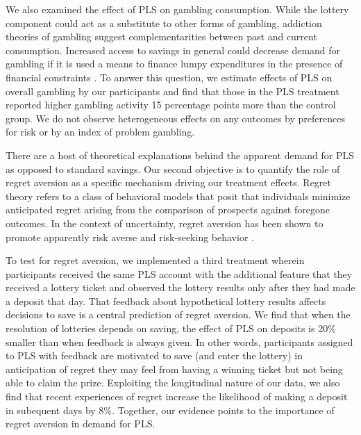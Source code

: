 \documentclass[11pt]{article}
\begin{document}
	We also examined the effect of PLS on gambling consumption. While the lottery component could act as a substitute to other forms of gambling, addiction theories of gambling \parencite{becker_theory_1988} suggest complementarities between past and current consumption. Increased access to savings in general could decrease demand for gambling if it is used a means to finance lumpy expenditures in the presence of financial constraints \textcite{herskowitz_gambling_2016}. To answer this question, we estimate effects of PLS on overall gambling by our participants and find that those in the PLS treatment reported higher gambling activity 15 percentage points more than the control group. We do not observe heterogeneous effects on any outcomes by preferences for risk or by an index of problem gambling.

	There are a host of theoretical explanations behind the apparent demand for PLS as opposed to standard savings. Our second objective is to quantify the role of regret aversion \parencite{bell_risk_1983,loomes_regret_1982} as a specific mechanism driving our treatment effects. Regret theory refers to a class of behavioral models that posit that individuals minimize anticipated regret arising from the comparison of prospects against foregone outcomes. In the context of uncertainty, regret aversion has been shown to promote apparently risk averse and risk-seeking behavior  \parencite{zeelenberg_consequences_1996}. 

	To test for regret aversion, we implemented a third treatment wherein participants received the same PLS account with the additional feature that they received a lottery ticket and observed the lottery results only after they had made a deposit that day. That feedback about hypothetical lottery results affects decisions to save is a central prediction of regret aversion. We find that when the resolution of lotteries depends on saving, the effect of PLS on deposits is 20\% smaller than when feedback is always given. In other words, participants assigned to PLS with feedback are motivated to save (and enter the lottery) in anticipation of regret they may feel from having a winning ticket but not being able to claim the prize. Exploiting the longitudinal nature of our data, we also find that recent experiences of regret increase the likelihood of making a deposit in subequent days by 8\%. Together, our evidence points to the importance of regret aversion in demand for PLS.
\end{document}
